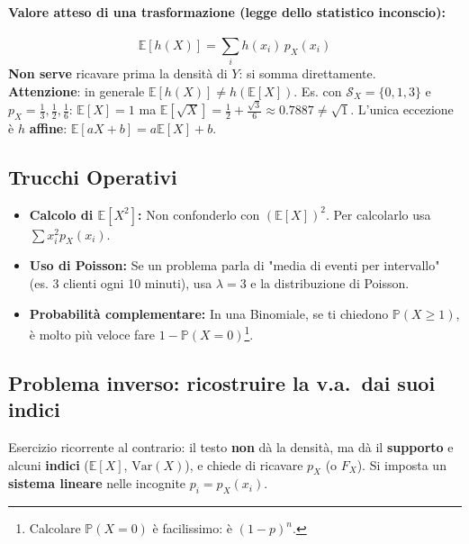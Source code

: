 \documentclass[12pt]{extarticle} %
\begin{document}
\paragraph{Valore atteso di una trasformazione (legge dello statistico inconscio):}
$$ \mathbb{E}[h(X)] = \sum_i h(x_i) \, p_X(x_i) $$
\textbf{Non serve} ricavare prima la densità di $Y$: si somma direttamente. \\
{\footnotesize \textbf{Attenzione}: in generale $\mathbb{E}[h(X)] \ne h(\mathbb{E}[X])$. Es. con $\mathcal{S}_X = \{0,1,3\}$ e $p_X = \frac13,\frac12,\frac16$: $\mathbb{E}[X] = 1$ ma $\mathbb{E}[\sqrt{X}] = \frac12 + \frac{\sqrt3}{6} \approx 0.7887 \ne \sqrt{1}$. L'unica eccezione è $h$ \textbf{affine}: $\mathbb{E}[aX+b] = a\mathbb{E}[X]+b$.}

\subsection{Trucchi Operativi}
\begin{itemize}
    \item \textbf{Calcolo di $\mathbb{E}[X^2]$:} Non confonderlo con $(\mathbb{E}[X])^2$. Per calcolarlo usa $\sum x_i^2 p_X(x_i)$.
    \item \textbf{Uso di Poisson:} Se un problema parla di "media di eventi per intervallo" (es. 3 clienti ogni 10 minuti), usa $\lambda = 3$ e la distribuzione di Poisson.
    \item \textbf{Probabilità complementare:} In una Binomiale, se ti chiedono $\mathbb{P}(X \ge 1)$, è molto più veloce fare $1 - \mathbb{P}(X = 0)$\footnote{Calcolare $\mathbb{P}(X=0)$ è facilissimo: è $(1-p)^n$.}.
\end{itemize}

\subsection{Problema inverso: ricostruire la v.a.\ dai suoi indici}
Esercizio ricorrente al contrario: il testo \textbf{non} dà la densità, ma dà il \textbf{supporto} e alcuni \textbf{indici} ($\mathbb{E}[X]$, $\mathrm{Var}(X)$), e chiede di ricavare $p_X$ (o $F_X$). Si imposta un \textbf{sistema lineare} nelle incognite $p_i = p_X(x_i)$.
\end{document}
